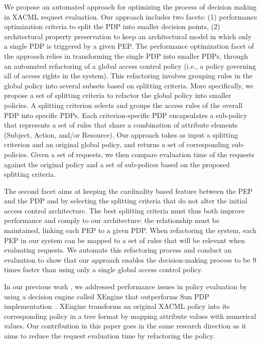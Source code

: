 We propose an automated approach for optimizing the process of decision making in XACML request evaluation. 
Our approach includes two facets: (1) performance optimization criteria to split the PDP into smaller decision points,
(2) architectural property preservation to keep an architectural model in which only a single PDP is triggered by a given PEP. 
The performance optimization facet of the approach relies in transforming the single PDP into smaller PDPs,
through an automated refactoring of a global access control policy (i.e., a policy governing all of access rights in the system).
This refactoring involves grouping rules in the global policy into several subsets based on splitting criteria. More specifically, we propose a set of splitting criteria to
 refactor the global policy into smaller policies.
A splitting criterion selects and groups the access rules of the overall PDP into specific PDPs.
Each criterion-specific PDP encapsulates a sub-policy that represents a set of rules that share a combination
of attribute elements (Subject, Action, and/or Resource). Our approach takes as input a splitting criterion and an original global policy, and returns a set of 
corresponding sub-policies. Given a set of requests, we then compare evaluation time of the requests against the original policy and a set of sub-polices 
based on the proposed splitting criteria.

The second facet aims at keeping the cardinality based feature between the PEP and the PDP and by selecting the splitting criteria that
do not alter the initial access control architecture. The best splitting criteria must thus both improve performance and comply to our architecture: the relationship must be maintained,
linking each PEP to a given PDP. When refactoring the system, each PEP in our system can be mapped to a set of rules that will be relevant when evaluating
requests. We automate this refactoring process and conduct an evaluation to show that our approach enables the decision-making process to be 9 times faster than
using only a single global access control policy.

In our previous work \cite{Xengine}, we addressed performance issues in policy evaluation by using
a decision engine called XEngine that outperforms Sun PDP implementation~\cite{oasis}. XEngine transforms an original XACML policy
into its corresponding policy in a tree format by mapping attribute values with numerical values.
Our contribution in this paper goes in the same research direction as it aims to reduce the request evaluation time by refactoring the policy.


